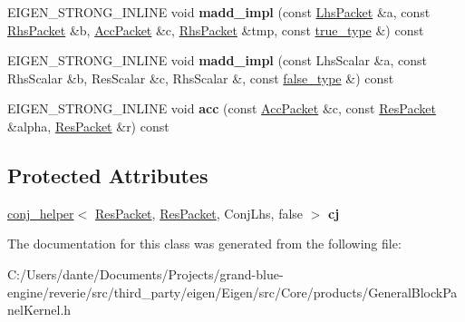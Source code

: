 \begin{DoxyCompactItemize}
E\+I\+G\+E\+N\+\_\+\+S\+T\+R\+O\+N\+G\+\_\+\+I\+N\+L\+I\+NE void {\bfseries madd\+\_\+impl} (const \mbox{\hyperlink{struct_eigen_1_1internal_1_1true__type}{Lhs\+Packet}} \&a, const \mbox{\hyperlink{struct_eigen_1_1internal_1_1true__type}{Rhs\+Packet}} \&b, \mbox{\hyperlink{struct_eigen_1_1internal_1_1true__type}{Acc\+Packet}} \&c, \mbox{\hyperlink{struct_eigen_1_1internal_1_1true__type}{Rhs\+Packet}} \&tmp, const \mbox{\hyperlink{struct_eigen_1_1internal_1_1true__type}{true\+\_\+type}} \&) const
\item 
\mbox{\label{class_eigen_1_1internal_1_1gebp__traits_3_01std_1_1complex_3_01_real_scalar_01_4_00_01_real_scald728c008ac4da8a5a1327d1e06be8c1f_a285a9c1d6257f4aa72fa26a697e5894b}} 
E\+I\+G\+E\+N\+\_\+\+S\+T\+R\+O\+N\+G\+\_\+\+I\+N\+L\+I\+NE void {\bfseries madd\+\_\+impl} (const Lhs\+Scalar \&a, const Rhs\+Scalar \&b, Res\+Scalar \&c, Rhs\+Scalar \&, const \mbox{\hyperlink{struct_eigen_1_1internal_1_1false__type}{false\+\_\+type}} \&) const
\item 
\mbox{\label{class_eigen_1_1internal_1_1gebp__traits_3_01std_1_1complex_3_01_real_scalar_01_4_00_01_real_scald728c008ac4da8a5a1327d1e06be8c1f_a035d3a0d089572b96aa8c2477f3ab2ae}} 
E\+I\+G\+E\+N\+\_\+\+S\+T\+R\+O\+N\+G\+\_\+\+I\+N\+L\+I\+NE void {\bfseries acc} (const \mbox{\hyperlink{struct_eigen_1_1internal_1_1true__type}{Acc\+Packet}} \&c, const \mbox{\hyperlink{struct_eigen_1_1internal_1_1true__type}{Res\+Packet}} \&alpha, \mbox{\hyperlink{struct_eigen_1_1internal_1_1true__type}{Res\+Packet}} \&r) const
\end{DoxyCompactItemize}
\subsection*{Protected Attributes}
\begin{DoxyCompactItemize}
\item 
\mbox{\label{class_eigen_1_1internal_1_1gebp__traits_3_01std_1_1complex_3_01_real_scalar_01_4_00_01_real_scald728c008ac4da8a5a1327d1e06be8c1f_abc0364d9773a89574429446d362d0cee}} 
\mbox{\hyperlink{struct_eigen_1_1internal_1_1conj__helper}{conj\+\_\+helper}}$<$ \mbox{\hyperlink{struct_eigen_1_1internal_1_1true__type}{Res\+Packet}}, \mbox{\hyperlink{struct_eigen_1_1internal_1_1true__type}{Res\+Packet}}, Conj\+Lhs, false $>$ {\bfseries cj}
\end{DoxyCompactItemize}


The documentation for this class was generated from the following file\+:\begin{DoxyCompactItemize}
\item 
C\+:/\+Users/dante/\+Documents/\+Projects/grand-\/blue-\/engine/reverie/src/third\+\_\+party/eigen/\+Eigen/src/\+Core/products/General\+Block\+Panel\+Kernel.\+h\end{DoxyCompactItemize}
